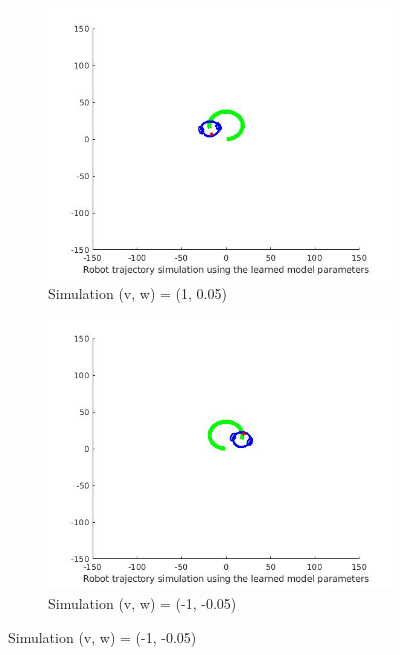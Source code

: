 \documentclass{article}
\begin{document}
\begin{figure}[ht]
\begin{subfigure}{.5\textwidth}
	\end{subfigure}
	\begin{subfigure}{.5\textwidth}
		\centering
		\includegraphics[width=1.\linewidth]{1c.jpg}  
		\caption{Simulation (v, w) = (1, 0.05)}
	\end{subfigure}
	\begin{subfigure}{.5\textwidth}
		\centering
		\includegraphics[width=1.\linewidth]{1d.jpg}  
		\caption{Simulation (v, w) = (-1, -0.05)}
	\end{subfigure}
\end{figure}
\newpage
\end{document}

